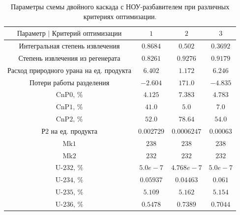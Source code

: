 \begin{table}
    \begin{tabular}{cccc}
        $\text{Параметр | Критерий оптимизации}$ & $\text{1}$ & $\text{2}$ & $\text{3}$\\ \hline
        $\text{Интегральная степень извлечения}$ & $0.8684$ & $0.502$ & $0.3692$\\ \hline$\text{Степень извлечения из регенерата}$ & $0.8261$ & $0.9276$ & $0.9179$\\ \hline
        $\text{Расход природного урана на ед. продукта}$ & $6.402$ & $1.172$ & $6.246$\\ \hline$\text{Потери работы разделения}$ & $-2.604$ & $171.0$ & $-4.835$\\ \hline
        $\text{CnP0, \%}$ & $4.125$ & $7.383$ & $4.783$\\ \hline
        $\text{CnP1, \%}$ & $41.0$ & $5.0$ & $7.0$\\ \hline
        $\text{CnP2, \%}$ & $52.0$ & $78.64$ & $54.0$\\ \hline$\text{Р2 на ед. продукта}$ & $0.002729$ & $0.0006247$ & $0.00063$\\ \hline
        $\text{Mk1}$ & $238$ & $238$ & $238$\\ \hline
        $\text{Mk2}$ & $232$ & $232$ & $232$\\ \hline
        $\text{U-232, \%}$ & $5.0e-7$ & $4.768e-7$ & $5.0e-7$\\ \hline
        $\text{U-234, \%}$ & $0.05937$ & $0.04463$ & $0.061$\\ \hline
        $\text{U-235, \%}$ & $5.109$ & $5.162$ & $5.154$\\ \hline
        $\text{U-236, \%}$ & $0.5478$ & $0.7389$ & $0.7044$
    \end{tabular}
\caption{Параметры схемы двойного каскада с НОУ-разбавителем при различных критериях оптимизации.{\label{5opt2}}}
\end{table}


